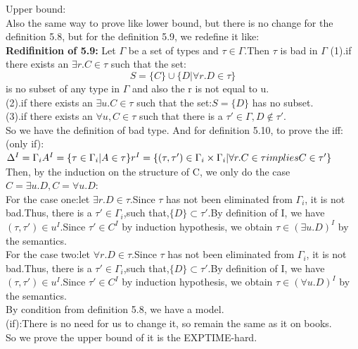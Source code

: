 \documentclass{article}
\begin{document}
    Upper bound:\\
    Also the same way to prove like lower bound, but there is no change for the definition 5.8, but for the definition 5.9, we redefine it like:\\
    \textbf{Redifinition of 5.9:}
    Let $\Gamma$ be a set of types and $\tau \in \Gamma$.Then $\tau$ is bad in $\Gamma$ 
    (1).if there exists an $\exists r.C\in \tau$ such that the set:
    \[
        S = \{C\}\cup \{D | \forall r.D \in \tau\}  
    \]
    is no subset of any type in $\Gamma$ and also the r is not equal to u.\\ 
    (2).if there exists an $\exists u.C\in \tau$ such that the set:$S = \{D\}$ has no subset.\\
    (3).if there exists an $\forall u,C\in \tau$ such that there is a $\tau' \in \Gamma, D \notin \tau'$.\\
    So we have the definition of bad type. And for definition 5.10, to prove the iff:\\
    (only if):$\Delta^I = \Gamma_i\\
    A^I = \{\tau \in \Gamma_i | A \in \tau\}\\
    r^I = \{(\tau,\tau')\in \Gamma_i \times \Gamma_i| \forall r.C \in \tau implies C \in \tau' \}$\\
    Then, by the induction on the structure of C, we only do the case $C = \exists u.D, C = \forall u.D$:\\
    For the case one:let $\exists r.D\in \tau$.Since $\tau$ has not been eliminated from $\Gamma_i$, it is not bad.Thus, there is 
    a $\tau'\in \Gamma_i$,such that,$\{D\}\subset \tau'$.By definition of I, we have $(\tau,\tau')\in u^I$.Since $\tau'\in C^I$ by induction hypothesis, we obtain $\tau \in(\exists u.D)^I$ by the semantics.\\
    For the case two:let $\forall r.D\in \tau$.Since $\tau$ has not been eliminated from $\Gamma_i$, it is not bad.Thus, there is 
    a $\tau'\in \Gamma_i$,such that,$\{D\}\subset \tau'$.By definition of I, we have $(\tau,\tau')\in u^I$.Since $\tau'\in C^I$ by induction hypothesis, we obtain $\tau \in(\forall u.D)^I$ by the semantics.\\
    By condition from definition 5.8, we have a model.\\
    (if):There is no need for us to change it, so remain the same as it on books.\\
    So we prove the upper bound of it is the EXPTIME-hard.\\
\end{document}

